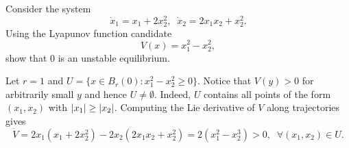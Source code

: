 \question[20]
%
Consider the system \[ \dot{x}_1 = x_1 + 2x_2^2, \;\; \dot{x}_2 = 2x_1x_2 +
x_2^2. \] Using the Lyapunov function candidate \[ V(x) = x_1^2 - x_2^2, \] show 
that $0$ is an unstable equilibrium.

\begin{solution}

Let $r = 1$ and $U = \{ x \in B_r(0): x_1^2 - x_2^2 \geq 0 \}$. Notice that
$V(y) > 0$ for arbitrarily small $y$ and hence $U \neq \emptyset$. Indeed, $U$
contains all points of the form $(x_1, x_2)$ with $\left|{x_1}\right| \geq \left|{x_2}\right|$. 
Computing the Lie derivative of $V$ along trajectories gives 
\[ \dot{V} = 2x_1(x_1 + 2x_2^2) - 2x_2(2x_1x_2 + x_2^2) = 2(x_1^2 - x_2^3) > 0,
\;\; \forall (x_1,x_2) \in U. \]

\end{solution}